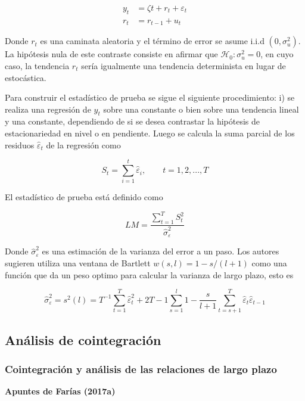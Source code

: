 \documentclass[12pt, twoside]{book}\usepackage[]{graphicx}\usepackage[]{color}
\numberwithin{equation}{section}
\numberwithin{theorem}{section}
\numberwithin{teorema}{section}
\numberwithin{defi}{section}
\numberwithin{prop}{section}
\numberwithin{defi}{section}
\theoremstyle{plain}
\begin{document}
\begin{align}
y_{t} & = \zeta t+r_{t}+\varepsilon_{t} \\  
r_{t} & = r_{t-1}+u_{t}
\end{align}

Donde $r_{t}$ es una caminata aleatoria y el término de error se asume i.i.d $(0,\sigma^{2}_{u})$. La hipótesis nula de este contraste consiste en afirmar que $\mathcal{H}_{0}: \sigma^{2}_{u}=0$, en cuyo caso, la tendencia $r_{t}$ sería igualmente una tendencia determinista en lugar de estocástica. 

Para construir el estadístico de prueba se sigue el siguiente procedimiento: i) se realiza una regresión de $y_{t}$ sobre una constante o bien sobre una tendencia lineal y una constante, dependiendo de si se desea contrastar la hipótesis de estacionariedad en nivel o en pendiente. Luego se calcula la suma parcial de los residuos $\hat{\varepsilon}_{t}$ de la regresión como 

\begin{equation}
S_{t} = \sum_{i=1}^{t}\hat{\varepsilon}_{i}, \qquad t=1,2,...,T
\end{equation}

El estadístico de prueba está definido como 

\begin{equation}
LM  = \frac{\sum_{t=1}^{T}S_{t}^{2}}{\hat{\sigma}^{2}_{\varepsilon}}
\end{equation}

Donde $\hat{\sigma}^{2}_{\varepsilon}$ es una estimación de la varianza del error a un paso. Los autores sugieren utiliza una ventana de Bartlett $w(s,l)=1-s/(l+1)$ como una función que da un peso optimo para calcular la varianza de largo plazo, esto es

\begin{equation}
\hat{\sigma}^{2}_{\varepsilon} = s^{2}(l)=T^{-1}\sum_{t=1}^{T}\hat{\varepsilon}^{2}_{t}+2T-1\sum_{s=1}^{l}1-\frac{s}{l+1}\sum_{t=s+1}^{T}\hat{\varepsilon}_{t}\hat{\varepsilon}_{t-1}
\end{equation}



\subsection{Análisis de cointegración}
\subsubsection{Cointegración y análisis de las relaciones de largo plazo}
 \textbf{Apuntes de Farías (2017a)}
\end{document}

